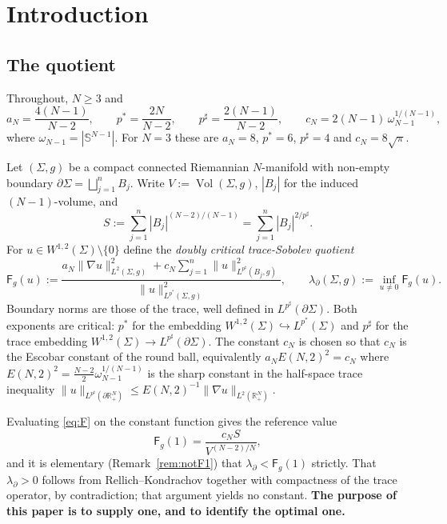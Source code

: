 \documentclass[11pt,reqno]{amsart}
\theoremstyle{plain}
\theoremstyle{definition}
\newcommand{\R}{\mathbb{R}}
\newcommand{\Sph}{\mathbb{S}}
\newcommand{\aN}{a_N}
\newcommand{\cN}{c_N}
\newcommand{\pstar}{p^{*}}
\newcommand{\psharp}{p^{\sharp}}
\newcommand{\Vol}{\operatorname{Vol}}
\newcommand{\Fq}{\mathsf{F}}
\begin{document}
\maketitle

\section{Introduction}
\label{sec:intro}

\subsection{The quotient}
Throughout, $N\ge3$ and
\begin{equation}
\label{eq:constants}
  \aN=\frac{4(N-1)}{N-2},\qquad
  \pstar=\frac{2N}{N-2},\qquad
  \psharp=\frac{2(N-1)}{N-2},\qquad
  \cN=2(N-1)\,\omega_{N-1}^{1/(N-1)},
\end{equation}
where $\omega_{N-1}=|\Sph^{N-1}|$. For $N=3$ these are $\aN=8$, $\pstar=6$,
$\psharp=4$ and $\cN=8\sqrt{\pi}$.

Let $(\Sigma,g)$ be a compact connected Riemannian $N$-manifold with non-empty
boundary $\partial\Sigma=\bigsqcup_{j=1}^{n}B_j$. Write $V:=\Vol(\Sigma,g)$,
$|B_j|$ for the induced $(N-1)$-volume, and
\begin{equation}
\label{eq:S}
  S:=\sum_{j=1}^{n}|B_j|^{(N-2)/(N-1)}=\sum_{j=1}^n|B_j|^{2/\psharp}.
\end{equation}
For $u\in W^{1,2}(\Sigma)\setminus\{0\}$ define the \emph{doubly critical
trace-Sobolev quotient}
\begin{equation}
\label{eq:F}
  \Fq_g(u):=\frac{\aN\|\nabla u\|_{L^2(\Sigma,g)}^2
                  +\cN\sum_{j=1}^{n}\|u\|^2_{L^{\psharp}(B_j,g)}}
                 {\|u\|^2_{L^{\pstar}(\Sigma,g)}},
  \qquad
  \lambda_\partial(\Sigma,g):=\inf_{u\neq0}\Fq_g(u).
\end{equation}
Boundary norms are those of the trace, well defined in $L^{\psharp}(\partial\Sigma)$.
Both exponents are critical: $\pstar$ for the embedding
$W^{1,2}(\Sigma)\hookrightarrow L^{\pstar}(\Sigma)$ and $\psharp$ for the trace
embedding $W^{1,2}(\Sigma)\to L^{\psharp}(\partial\Sigma)$. The constant $\cN$ is
chosen so that $\cN$ is the Escobar constant of the round ball, equivalently
$\aN E(N,2)^2=\cN$ where $E(N,2)^2=\tfrac{N-2}{2}\omega_{N-1}^{1/(N-1)}$ is the
sharp constant in the half-space trace inequality
$\|u\|_{L^{\psharp}(\partial\R^N_+)}\le E(N,2)^{-1}\|\nabla u\|_{L^2(\R^N_+)}$.

Evaluating \eqref{eq:F} on the constant function gives the reference value
\begin{equation}
\label{eq:F1}
  \Fq_g(1)=\frac{\cN S}{V^{(N-2)/N}} ,
\end{equation}
and it is elementary (Remark~\ref{rem:notF1}) that $\lambda_\partial<\Fq_g(1)$
strictly. That $\lambda_\partial>0$ follows from Rellich--Kondrachov together with
compactness of the trace operator, by contradiction; that argument yields no
constant. \textbf{The purpose of this paper is to supply one, and to identify the
optimal one.}
\end{document}
